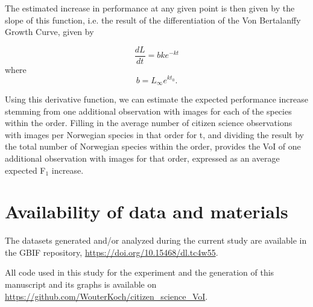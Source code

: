 \documentclass{article}
\begin{document}
The estimated increase in performance at any given point is then given by the slope of this function, i.e. the result of the differentiation of the Von Bertalanffy Growth Curve, given\autocite{Campbell1972} by

\[ \frac{dL}{dt} = bke^{-kt} \]
where
\[ b = L_\infty e^{kt_0}. \]

Using this derivative function, we can estimate the expected performance increase stemming from one additional observation with images for each of the species within the order. Filling in the average number of citizen science observations with images per Norwegian species in that order for t, and dividing the result by the total number of Norwegian species within the order, provides the VoI of one additional observation with images for that order, expressed as an average expected F\(_1\) increase.

\printbibliography



\section*{Availability of data and materials}
The datasets generated and/or analyzed during the current study are available in the GBIF repository, \url{https://doi.org/10.15468/dl.tc4w55}.

All code used in this study for the experiment and the generation of this manuscript and its graphs is available on \url{https://github.com/WouterKoch/citizen_science_VoI}.
\end{document}
